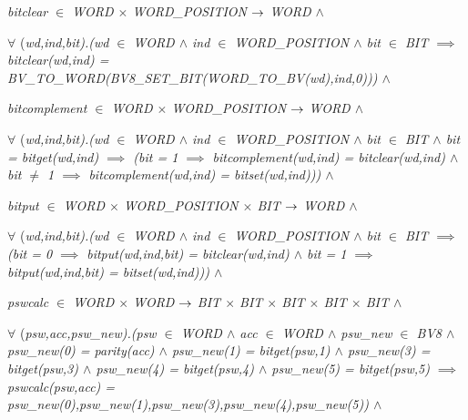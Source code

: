 \begin{sloppypar}
\hspace*{0.10in}\it bitclear $\in$  \it WORD $\times$ \it WORD\_POSITION  $\rightarrow$  \it WORD  $\land$ 

\hspace*{0.10in} $\forall$ \rm (\it wd\rm ,\it ind\rm ,\it bit\rm )\rm .\rm (\it wd $\in$  \it WORD  $\land$  \it ind $\in$  \it WORD\_POSITION  $\land$  \it bit $\in$  \it BIT  $\implies$  \it bitclear\rm (\it wd\rm ,\it ind\rm ) \rm = \it BV\_TO\_WORD\rm (\it BV8\_SET\_BIT\rm (\it WORD\_TO\_BV\rm (\it wd\rm )\rm ,\it ind\rm ,\rm 0\rm )\rm )\rm )  $\land$ 

\hspace*{0.10in}\it bitcomplement $\in$  \it WORD $\times$ \it WORD\_POSITION  $\rightarrow$  \it WORD  $\land$ 

\hspace*{0.10in} $\forall$ \rm (\it wd\rm ,\it ind\rm ,\it bit\rm )\rm .\rm (\it wd $\in$  \it WORD  $\land$  \it ind $\in$  \it WORD\_POSITION  $\land$  \it bit $\in$  \it BIT  $\land$  \it bit \rm = \it bitget\rm (\it wd\rm ,\it ind\rm )  $\implies$  \rm (\it bit \rm = \rm 1  $\implies$  \it bitcomplement\rm (\it wd\rm ,\it ind\rm ) \rm = \it bitclear\rm (\it wd\rm ,\it ind\rm )  $\land$  \it bit $\not =$ \rm 1  $\implies$  \it bitcomplement\rm (\it wd\rm ,\it ind\rm ) \rm = \it bitset\rm (\it wd\rm ,\it ind\rm )\rm )\rm )  $\land$ 

\hspace*{0.10in}\it bitput $\in$  \it WORD $\times$ \it WORD\_POSITION $\times$ \it BIT  $\rightarrow$  \it WORD  $\land$ 

\hspace*{0.10in} $\forall$ \rm (\it wd\rm ,\it ind\rm ,\it bit\rm )\rm .\rm (\it wd $\in$  \it WORD  $\land$  \it ind $\in$  \it WORD\_POSITION  $\land$  \it bit $\in$  \it BIT  $\implies$  \rm (\it bit \rm = \rm 0  $\implies$  \it bitput\rm (\it wd\rm ,\it ind\rm ,\it bit\rm ) \rm = \it bitclear\rm (\it wd\rm ,\it ind\rm )  $\land$  \it bit \rm = \rm 1  $\implies$  \it bitput\rm (\it wd\rm ,\it ind\rm ,\it bit\rm ) \rm = \it bitset\rm (\it wd\rm ,\it ind\rm )\rm )\rm )  $\land$ 

\hspace*{0.10in}\it pswcalc $\in$  \it WORD $\times$ \it WORD  $\rightarrow$  \it BIT $\times$ \it BIT $\times$ \it BIT $\times$ \it BIT $\times$ \it BIT  $\land$ 

\hspace*{0.10in} $\forall$ \rm (\it psw\rm ,\it acc\rm ,\it psw\_new\rm )\rm .\rm (\it psw $\in$  \it WORD  $\land$  \it acc $\in$  \it WORD  $\land$  \it psw\_new $\in$  \it BV8  $\land$  \it psw\_new\rm (\rm 0\rm ) \rm = \it parity\rm (\it acc\rm )  $\land$  \it psw\_new\rm (\rm 1\rm ) \rm = \it bitget\rm (\it psw\rm ,\rm 1\rm )  $\land$  \it psw\_new\rm (\rm 3\rm ) \rm = \it bitget\rm (\it psw\rm ,\rm 3\rm )  $\land$  \it psw\_new\rm (\rm 4\rm ) \rm = \it bitget\rm (\it psw\rm ,\rm 4\rm )  $\land$  \it psw\_new\rm (\rm 5\rm ) \rm = \it bitget\rm (\it psw\rm ,\rm 5\rm )  $\implies$  \it pswcalc\rm (\it psw\rm ,\it acc\rm ) \rm = \it psw\_new\rm (\rm 0\rm )\rm ,\it psw\_new\rm (\rm 1\rm )\rm ,\it psw\_new\rm (\rm 3\rm )\rm ,\it psw\_new\rm (\rm 4\rm )\rm ,\it psw\_new\rm (\rm 5\rm )\rm )  $\land$ 


\end{sloppypar}
